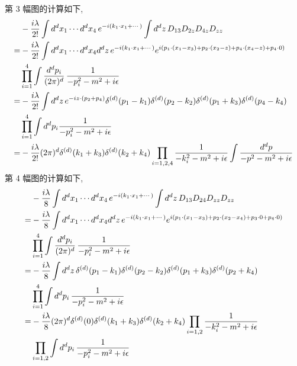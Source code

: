 \begin{itemize}
	\begin{tcolorbox}[title=calculation:]
		第 3 幅图的计算如下,
		\begin{align}
			& - \frac{i \lambda}{2!} \int d^d x_1 \cdots d^d x_4 \, e^{- i (k_1 \cdot x_1 + \cdots)} \int d^d z \, D_{1 3} D_{2 z} D_{4 z} D_{z z} \notag \\
			=& - \frac{i \lambda}{2!} \int d^d x_1 \cdots d^d x_4 d^d z \, e^{- i (k_1 \cdot x_1 + \cdots)} e^{i (p_1 \cdot (x_1 - x_3) + p_2 \cdot (x_2 - z) + p_4 \cdot (x_4 - z) + p_4 \cdot 0)} \notag \\
			& \prod_{i = 1}^4 \int \frac{d^d p_i}{(2 \pi)^d} \, \frac{1}{- p_i^2 - m^2 + i \epsilon} \notag \\
			=& - \frac{i \lambda}{2!} \int d^d z \, e^{- i z \cdot (p_2 + p_4)} \delta^{(d)}(p_1 - k_1) \delta^{(d)}(p_2 - k_2) \delta^{(d)}(p_1 + k_3) \delta^{(d)}(p_4 - k_4) \notag \\
			& \prod_{i = 1}^4 \int d^d p_i \frac{1}{- p_i^2 - m^2 + i \epsilon} \notag \\
			=& - \frac{i \lambda}{2!} (2 \pi)^d \delta^{(d)}(k_1 + k_3) \delta^{(d)}(k_2 + k_4) \prod_{i = 1, 2, 4} \frac{1}{- k_i^2 - m^2 + i \epsilon} \int \frac{d^d p}{- p^2 - m^2 + i \epsilon}
		\end{align}
		第 4 幅图的计算如下,
		\begin{align}
			& - \frac{i \lambda}{8} \int d^d x_1 \cdots d^d x_4 \, e^{- i (k_1 \cdot x_1 + \cdots)} \int d^d z \, D_{1 3} D_{2 4} D_{z z} D_{z z} \notag \\
			=& - \frac{i \lambda}{8} \int d^d x_1 \cdots d^d x_4 d^d z \, e^{- i (k_1 \cdot x_1 + \cdots)} e^{i (p_1 \cdot (x_1 - x_3) + p_2 \cdot (x_2 - x_4) + p_3 \cdot 0 + p_4 \cdot 0)} \notag \\
			& \prod_{i = 1}^4 \int \frac{d^d p_i}{(2 \pi)^d} \, \frac{1}{- p_i^2 - m^2 + i \epsilon} \notag \\
			=& - \frac{i \lambda}{8} \int d^d z \, \delta^{(d)}(p_1 - k_1) \delta^{(d)}(p_2 - k_2) \delta^{(d)}(p_1 + k_3) \delta^{(d)}(p_2 + k_4) \notag \\
			& \prod_{i = 1}^4 \int d^d p_i \, \frac{1}{- p_i^2 - m^2 + i \epsilon} \notag \\
			=& - \frac{i \lambda}{8} (2 \pi)^d \delta^{(d)}(0) \delta^{(d)}(k_1 + k_3) \delta^{(d)}(k_2 + k_4) \prod_{i = 1, 2} \frac{1}{- k_i^2 - m^2 + i \epsilon} \notag \\
			& \prod_{i = 1, 2} \int d^d p_i \, \frac{1}{- p_i^2 - m^2 + i \epsilon}
		\end{align}
	\end{tcolorbox}
	

\end{itemize}
